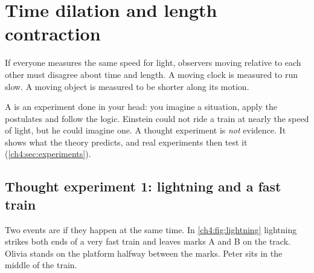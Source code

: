 \section{Time dilation and length contraction}\label{ch4:sec:time}

\begin{bigidea}
If everyone measures the same speed for light, observers moving relative to each other must
disagree about time and length. A moving clock is measured to run slow. A moving object is
measured to be shorter along its motion.
\end{bigidea}

\begin{keywords}
\end{keywords}

A  is an experiment done in your head: you imagine a situation, apply
the postulates and follow the logic. Einstein could not ride a train at nearly the speed of
light, but he could imagine one. A thought experiment is \emph{not} evidence. It shows what the
theory predicts, and real experiments then test it (\cref{ch4:sec:experiments}).

\subsection{Thought experiment 1: lightning and a fast train}
Two events are  if they happen at the same time. In \cref{ch4:fig:lightning}
lightning strikes both ends of a very fast train and leaves marks A and B on the track. Olivia
stands on the platform halfway between the marks. Peter sits in the middle of the train.


